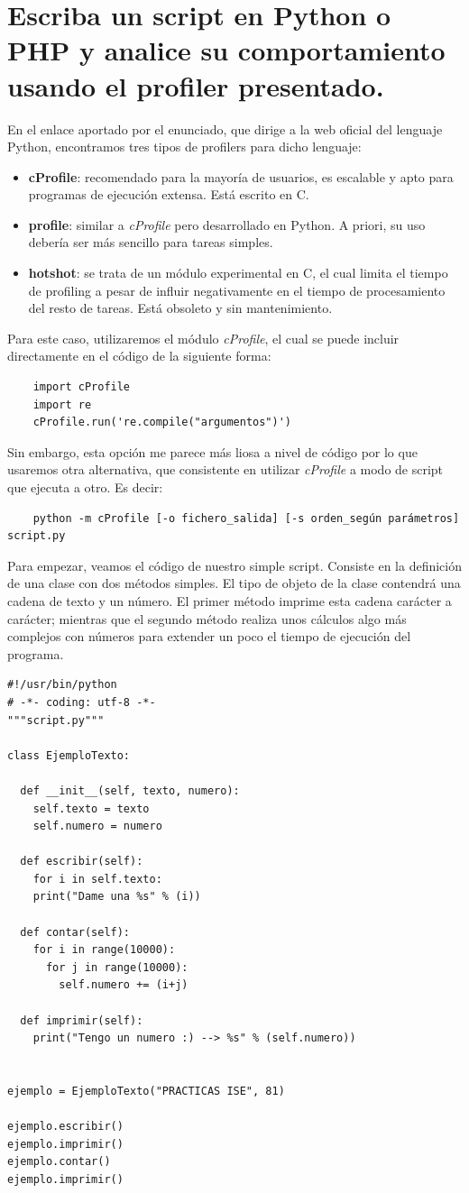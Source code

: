 \section{Escriba un script en Python o PHP y analice su comportamiento usando el profiler presentado.}
En el enlace aportado por el enunciado, que dirige a la web oficial del lenguaje Python, encontramos tres tipos de profilers para dicho lenguaje:
\begin{itemize}
	\item \textbf{cProfile}: recomendado para la mayoría de usuarios, es escalable y apto para programas de ejecución extensa. Está escrito en C.
	\item \textbf{profile}: similar a \emph{cProfile} pero desarrollado en Python. A priori, su uso debería ser más sencillo para tareas simples.
	\item \textbf{hotshot}: se trata de un módulo experimental en C, el cual limita el tiempo de profiling a pesar de influir negativamente en el tiempo de procesamiento del resto de tareas. Está obsoleto y sin mantenimiento.	
\end{itemize}
Para este caso, utilizaremos el módulo \emph{cProfile}, el cual se puede incluir directamente en el código de la siguiente forma:
\begin{verbatim}
	import cProfile
	import re
	cProfile.run('re.compile("argumentos")')
\end{verbatim}
Sin embargo, esta opción me parece más liosa a nivel de código por lo que usaremos otra alternativa, que consistente en utilizar \emph{cProfile} a modo de script que ejecuta a otro. Es decir:
\begin{verbatim}
	python -m cProfile [-o fichero_salida] [-s orden_según parámetros] script.py
\end{verbatim}
Para empezar, veamos el código de nuestro simple script. Consiste en la definición de una clase con dos métodos simples. El tipo de objeto de la clase contendrá una cadena de texto y un número. El primer método imprime esta cadena carácter a carácter; mientras que el segundo método realiza unos cálculos algo más complejos con números para extender un poco el tiempo de ejecución del programa.
\begin{verbatim}
#!/usr/bin/python
# -*- coding: utf-8 -*-
"""script.py"""

class EjemploTexto:

  def __init__(self, texto, numero):
    self.texto = texto
    self.numero = numero

  def escribir(self):
    for i in self.texto:
    print("Dame una %s" % (i))

  def contar(self):
    for i in range(10000):
      for j in range(10000):
        self.numero += (i+j)

  def imprimir(self):
    print("Tengo un numero :) --> %s" % (self.numero))


ejemplo = EjemploTexto("PRACTICAS ISE", 81)

ejemplo.escribir()
ejemplo.imprimir()
ejemplo.contar()
ejemplo.imprimir()
\end{verbatim}
